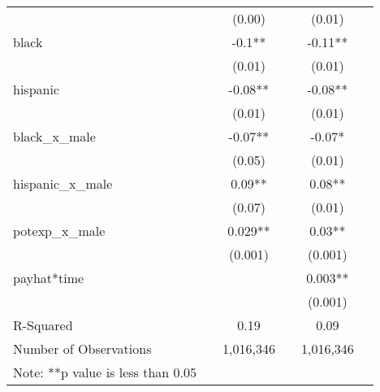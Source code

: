 \documentclass{article}
\begin{document}
\begin{table}[ht]
\begin{tabular}{llclcl}
                       &  & (0.00)    &            & (0.01)     &  \\
black                  &  & -0.1**    &            & -0.11**   &  \\
                       &  & (0.01)    &            & (0.01)    &  \\
hispanic               &  & -0.08**   &            & -0.08**   &  \\
                       &  & (0.01)     &            & (0.01)    & \\
black\_x\_male         &  & -0.07**   &            & -0.07*    &  \\
                       &  & (0.05)     &            & (0.01)    &  \\
hispanic\_x\_male      &  & 0.09**     &            & 0.08**    &   \\
                       &  & (0.07)    &            & (0.01)    & \\
potexp\_x\_male        &  & 0.029**     &            & 0.03**    &    \\
                       &  & (0.001)    &            & (0.001)    & \\
payhat*time            &  &              &            & 0.003**    & \\
                       &  &              &            & (0.001)    &  \\
R-Squared              &  & 0.19      &            & 0.09       & \\
Number of Observations &  & 1,016,346      &            & 1,016,346      & \\
\hline
Note: **p value is less than 0.05\\
\end{tabular}
\end{table}
\end{document}
